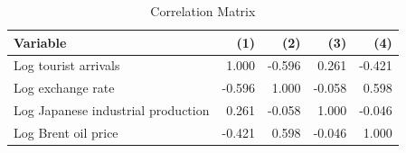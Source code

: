 \begin{table}[H]
\centering
\caption{Correlation Matrix}
\label{tab:corr}
\begin{tabular}{lrrrr}
\toprule
Variable & (1) & (2) & (3) & (4) \\
\midrule
Log tourist arrivals & 1.000 & -0.596 & 0.261 & -0.421 \\
Log exchange rate & -0.596 & 1.000 & -0.058 & 0.598 \\
Log Japanese industrial production & 0.261 & -0.058 & 1.000 & -0.046 \\
Log Brent oil price & -0.421 & 0.598 & -0.046 & 1.000 \\
\bottomrule
\end{tabular}
\end{table}
